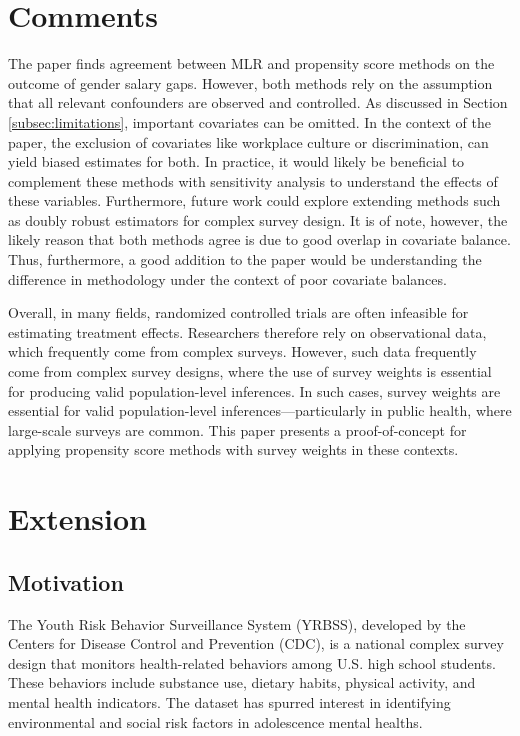 \documentclass[12pt]{article}
\begin{document}
\section{Comments} \label{sec:finalcomments}

The paper finds agreement between MLR and propensity score methods on the outcome of gender salary gaps. However, both methods rely on the assumption that all relevant confounders are observed and controlled. As discussed in Section \ref{subsec:limitations}, important covariates can be omitted. In the context of the paper, the exclusion of covariates like workplace culture or discrimination, can yield biased estimates for both. In practice, it would likely be beneficial to complement these methods with sensitivity analysis to understand the effects of these variables. Furthermore, future work could explore extending methods such as doubly robust estimators for complex survey design. It is of note, however, the likely reason that both methods agree is due to good overlap in covariate balance. Thus, furthermore, a good addition to the paper would be understanding the difference in methodology under the context of poor covariate balances. 

Overall, in many fields, randomized controlled trials are often infeasible for estimating treatment effects. Researchers therefore rely on observational data, which frequently come from complex surveys. However, such data frequently come from complex survey designs, where the use of survey weights is essential for producing valid population-level inferences. In such cases, survey weights are essential for valid population-level inferences—particularly in public health, where large-scale surveys are common. This paper presents a proof-of-concept for applying propensity score methods with survey weights in these contexts.

\section{Extension}

\subsection{Motivation}

The Youth Risk Behavior Surveillance System (YRBSS), developed by the Centers for Disease Control and Prevention (CDC), is a national complex survey design that monitors health-related behaviors among U.S. high school students. These behaviors include substance use, dietary habits, physical activity, and mental health indicators. The dataset has spurred interest in identifying environmental and social risk factors in adolescence mental healths. 
\end{document}
